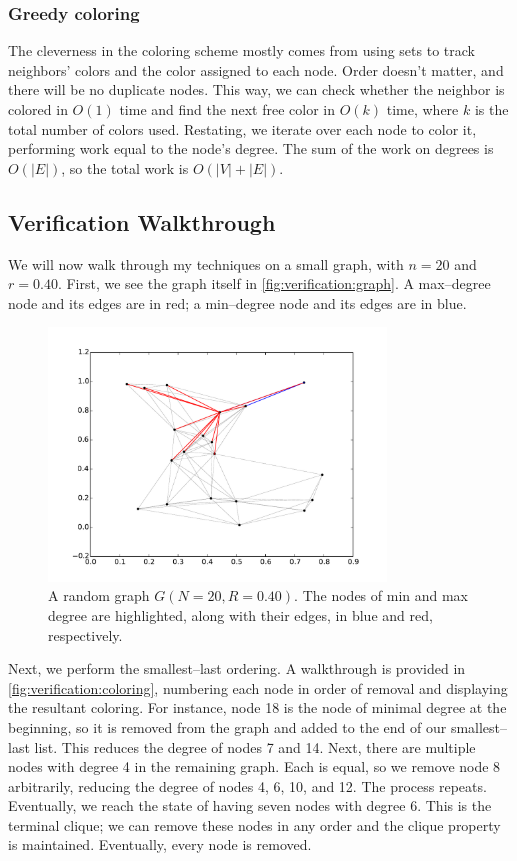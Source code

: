 \documentclass[oneside, titlepage]{scrartcl}
\begin{document}
\subsubsection{Greedy coloring}
The cleverness in the coloring scheme mostly comes from using sets to track neighbors' colors and the color assigned to each node. Order doesn't matter, and there will be no duplicate nodes. This way, we can check whether the neighbor is colored in $O(1)$ time and find the next free color in $O(k)$ time, where $k$ is the total number of colors used. Restating, we iterate over each node to color it, performing work equal to the node's degree. The sum of the work on degrees is $O(|E|)$, so the total work is $O(|V| + |E|)$.

\subsection{Verification Walkthrough}
We will now walk through my techniques on a small graph, with $n = 20$ and $r = 0.40$. First, we see the graph itself in \autoref{fig:verification:graph}. A max--degree node and its edges are in red; a min--degree node and its edges are in blue.

\begin{figure}[h!]
\centering
\includegraphics[width=0.8\textwidth]{figures/graph100.pdf}
\caption{A random graph $G(N=20, R=0.40)$. The nodes of min and max degree are highlighted, along with their edges, in blue and red, respectively.}
\label{fig:verification:graph}
\end{figure}

Next, we perform the smallest--last ordering. A walkthrough is provided in \autoref{fig:verification:coloring}, numbering each node in order of removal and displaying the resultant coloring. For instance, node 18 is the node of minimal degree at the beginning, so it is removed from the graph and added to the end of our smallest--last list. This reduces the degree of nodes 7 and 14. Next, there are multiple nodes with degree 4 in the remaining graph. Each is equal, so we remove node 8 arbitrarily, reducing the degree of nodes 4, 6, 10, and 12. The process repeats. Eventually, we reach the state of having seven nodes with degree 6. This is the terminal clique; we can remove these nodes in any order and the clique property is maintained. Eventually, every node is removed.
\end{document}
